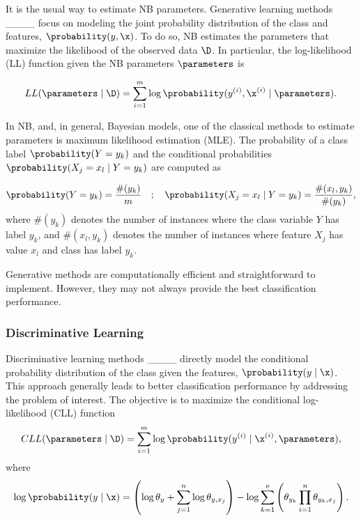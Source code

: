 It is the usual way to estimate NB parameters. Generative learning methods ____ focus on modeling the joint probability distribution of the class and features, $\probability(y, \x)$. To do so, NB estimates the parameters that maximize the likelihood of the observed data $\D$. In particular, the log-likelihood (LL) function given the NB parameters $\parameters$ is

\begin{equation*}
LL(\parameters \mid \D) = \sum_{i = 1}^{m} \log \probability(y^{(i)}, \x^{(i)} \mid \parameters).
\end{equation*}

In NB, and, in general, Bayesian models, one of the classical methods to estimate parameters is maximum likelihood estimation (MLE). The probability of a class label $\probability(Y = y_k)$ and the conditional probabilities $\probability(X_j = x_l \mid Y = y_k)$ are computed as

\begin{equation*}
\probability(Y = y_k) = \frac{\#(y_k)}{m} \quad ; \quad  \probability(X_j = x_l \mid Y = y_k) = \frac{\#(x_l, y_k)}{\#(y_k)},
\end{equation*} %
%
where $\#(y_k)$ denotes the number of instances where the class variable \(Y\) has label $y_k$, and $\#(x_l, y_k)$ denotes the number of instances where feature \(X_j\) has value \(x_l\) and class has label $y_k$.

Generative methods are computationally efficient and straightforward to implement. However, they may not always provide the best classification performance.


\subsubsection{Discriminative Learning}

Discriminative learning methods ____ directly model the conditional probability distribution of the class given the features, $\probability(y \mid \x)$. This approach generally leads to better classification performance by addressing the problem of interest. The objective is to maximize the conditional log-likelihood (CLL) function
%
\begin{equation*}
CLL(\parameters \mid \D) = \sum_{i = 1}^{m} \log \probability(y^{(i)} \mid \x^{(i)}, \parameters),
\end{equation*}
%
where
%
\begin{equation*}
    \log \probability(y \mid \x) =  \left(\log\theta_y + \sum_{j = 1}^{n} \log \theta_{y, x_j}\right) - \log \sum_{k = 1}^{o} \left(\theta_{y_k} \prod_{i = 1}^n \theta_{y_k, x_j}\right).
\end{equation*}

